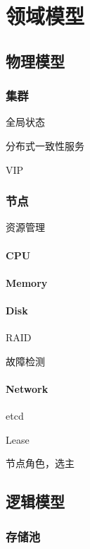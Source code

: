 \chapter{领域模型}

\section{物理模型}

\subsection{集群}

全局状态

分布式一致性服务

VIP

\subsection{节点}

资源管理

\subsubsection{CPU}

\subsubsection{Memory}
\subsubsection{Disk}

RAID

故障检测

\subsubsection{Network}

etcd

Lease

节点角色，选主


\section{逻辑模型}

\subsection{存储池}

